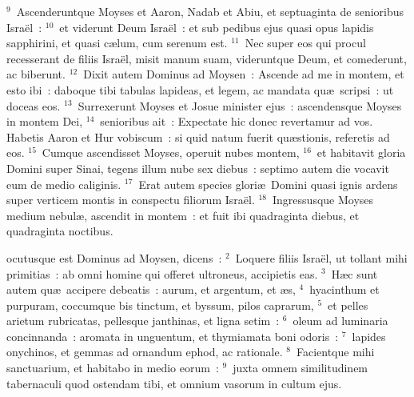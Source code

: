${}^{9}$~Ascenderuntque Moyses et Aaron, Nadab et Abiu, et septuaginta de senioribus Isra\"el~:
${}^{10}$~et viderunt Deum Isra\"el~: et sub pedibus ejus quasi opus lapidis sapphirini, et quasi c\ae lum, cum serenum est.
${}^{11}$~Nec super eos qui procul recesserant de filiis Isra\"el, misit manum suam, videruntque Deum, et comederunt, ac biberunt.
${}^{12}$~Dixit autem Dominus ad Moysen~: Ascende ad me in montem, et esto ibi~: daboque tibi tabulas lapideas, et legem, ac mandata qu\ae\ scripsi~: ut doceas eos.
${}^{13}$~Surrexerunt Moyses et Josue minister ejus~: ascendensque Moyses in montem Dei,
${}^{14}$~senioribus ait~: Expectate hic donec revertamur ad vos. Habetis Aaron et Hur vobiscum~: si quid natum fuerit qu\ae stionis, referetis ad eos.
${}^{15}$~Cumque ascendisset Moyses, operuit nubes montem,
${}^{16}$~et habitavit gloria Domini super Sinai, tegens illum nube sex diebus~: septimo autem die vocavit eum de medio caliginis.
${}^{17}$~Erat autem species glori\ae\ Domini quasi ignis ardens super verticem montis in conspectu filiorum Isra\"el.
${}^{18}$~Ingressusque Moyses medium nebul\ae , ascendit in montem~: et fuit ibi quadraginta diebus, et quadraginta noctibus.

\bchapter
{}ocutusque est Dominus ad Moysen, dicens~:
${}^{2}$~Loquere filiis Isra\"el, ut tollant mihi primitias~: ab omni homine qui offeret ultroneus, accipietis eas.
${}^{3}$~H\ae c sunt autem qu\ae\ accipere debeatis~: aurum, et argentum, et \ae s,
${}^{4}$~hyacinthum et purpuram, coccumque bis tinctum, et byssum, pilos caprarum,
${}^{5}$~et pelles arietum rubricatas, pellesque janthinas, et ligna setim~:
${}^{6}$~oleum ad luminaria concinnanda~: aromata in unguentum, et thymiamata boni odoris~:
${}^{7}$~lapides onychinos, et gemmas ad ornandum ephod, ac rationale.
${}^{8}$~Facientque mihi sanctuarium, et habitabo in medio eorum~:
${}^{9}$~juxta omnem similitudinem tabernaculi quod ostendam tibi, et omnium vasorum in cultum ejus.

